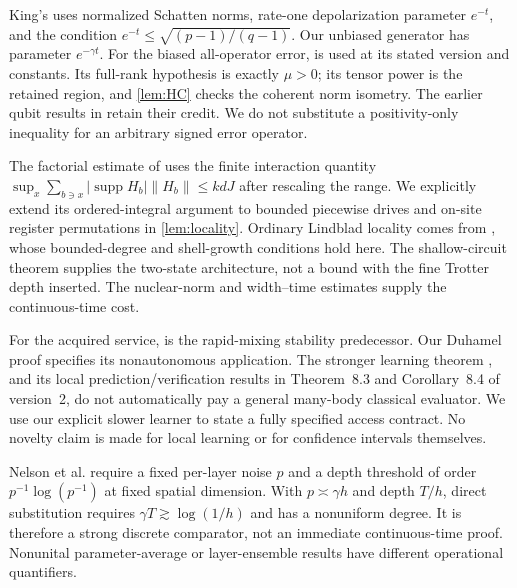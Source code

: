 \documentclass[11pt,reqno]{amsart}
\numberwithin{equation}{section}
\theoremstyle{definition}
\theoremstyle{remark}
\newcommand{\supp}{\operatorname{supp}}
\newcommand{\nn}[1]{\lVert#1\rVert}
\begin{document}
King's \cite[Corollary~2, (17)]{King} uses normalized Schatten norms, rate-one depolarization parameter $e^{-t}$, and the condition $e^{-t}\leq\sqrt{(p-1)/(q-1)}$. Our unbiased generator has parameter $e^{-\gamma t}$. For the biased all-operator error, \cite[Theorem~1.1]{DGOYZ} is used at its stated version and constants. Its full-rank hypothesis is exactly $\mu>0$; its tensor power is the retained region, and \cref{lem:HC} checks the coherent norm isometry. The earlier qubit results in \cite[Theorems~21 and~25]{BDR} retain their credit. We do not substitute a positivity-only inequality for an arbitrary signed error operator.

The factorial estimate of \cite[Appendix~C.4, (48)--(49)]{HHKL} uses the finite interaction quantity $\sup_x\sum_{b\ni x}|\supp H_b|\nn{H_b}\leq kdJ$ after rescaling the range. We explicitly extend its ordered-integral argument to bounded piecewise drives and on-site register permutations in \cref{lem:locality}. Ordinary Lindblad locality comes from \cite[Theorems~1--2]{BK}, whose bounded-degree and shell-growth conditions hold here. The shallow-circuit theorem \cite[Theorem~5]{BGM} supplies the two-state architecture, not a bound with the fine Trotter depth inserted. The nuclear-norm and width--time estimates supply the continuous-time cost.

For the acquired service, \cite[Theorem~1]{LCMP} is the rapid-mixing stability predecessor. Our Duhamel proof specifies its nonautonomous application. The stronger learning theorem \cite[Theorem~4.9]{MBFR}, and its local prediction/verification results in Theorem~8.3 and Corollary~8.4 of version~2, do not automatically pay a general many-body classical evaluator. We use our explicit slower learner to state a fully specified access contract. No novelty claim is made for local learning or for confidence intervals themselves.

Nelson et al. \cite[Theorem~2.3]{NR} require a fixed per-layer noise $p$ and a depth threshold of order $p^{-1}\log(p^{-1})$ at fixed spatial dimension. With $p\asymp\gamma h$ and depth $T/h$, direct substitution requires $\gamma T\gtrsim\log(1/h)$ and has a nonuniform degree. It is therefore a strong discrete comparator, not an immediate continuous-time proof. Nonunital parameter-average or layer-ensemble results \cite[Theorem~1]{Martinez}\cite[Theorem~1]{AMRCH} have different operational quantifiers.
\end{document}
